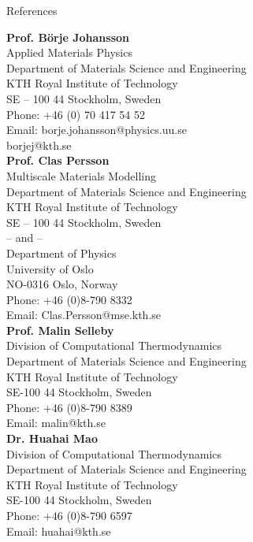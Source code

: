 \documentclass{resume} %
\begin{document}
\begin{rSection}{References}


{\bf Prof. Börje Johansson} \\
Applied Materials Physics \\
Department of Materials Science and Engineering \\
KTH Royal Institute of Technology \\
SE – 100 44 Stockholm, Sweden  \\
Phone: +46 (0) 70 417 54 52 \\
Email: borje.johansson@physics.uu.se \\
  \hspace*{11.5mm}     borjej@kth.se \\
  


{\bf Prof. Clas Persson} \\
Multiscale Materials Modelling \\
Department of Materials Science and Engineering \\
KTH Royal Institute of Technology \\
SE – 100 44 Stockholm, Sweden \\
 -- and -- \\
Department of Physics \\
University of Oslo \\
NO-0316 Oslo, Norway \\
Phone: +46 (0)8-790 8332\\
Email: Clas.Persson@mse.kth.se \\


{\bf Prof. Malin Selleby} \\
Division of Computational Thermodynamics \\
Department of Materials Science and Engineering \\
KTH Royal Institute of Technology \\
SE-100 44 Stockholm, Sweden \\
Phone: +46 (0)8-790 8389  \\
Email: malin@kth.se \\


{\bf Dr. Huahai Mao} \\
Division of Computational Thermodynamics \\
Department of Materials Science and Engineering \\
KTH Royal Institute of Technology \\
SE-100 44 Stockholm, Sweden \\
Phone: +46 (0)8-790 6597 \\
Email: huahai@kth.se \\


\end{rSection}

\end{document}
